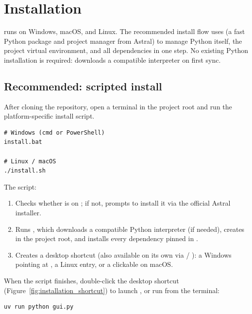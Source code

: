 \section{Installation}
\label{sec:installation}

\denis{} runs on Windows, macOS, and Linux. The recommended install
flow uses \href{https://docs.astral.sh/uv/}{} (a fast Python
package and project manager from Astral) to manage Python itself, the
project virtual environment, and all dependencies in one step. No
existing Python installation is required:  downloads a
compatible interpreter on first sync.

\subsection{Recommended: scripted install}

After cloning the repository, open a terminal in the project root and
run the platform-specific install script.

\begin{lstlisting}
# Windows (cmd or PowerShell)
install.bat

# Linux / macOS
./install.sh
\end{lstlisting}

The script:
\begin{enumerate}
    \item Checks whether  is on ; if not, prompts to
        install it via the official Astral installer.
    \item Runs , which downloads a compatible Python
        interpreter (if needed), creates  in the project
        root, and installs every dependency pinned in
        .
    \item Creates a desktop shortcut (also available on its own via
         / ):
        a Windows  pointing at
        ,
        a Linux  entry, or a clickable
         on macOS.
\end{enumerate}

When the script finishes, double-click the desktop shortcut
(Figure~\ref{fig:installation_shortcut}) to launch \denis{}, or run
from the terminal:

\begin{lstlisting}
uv run python gui.py
\end{lstlisting}

